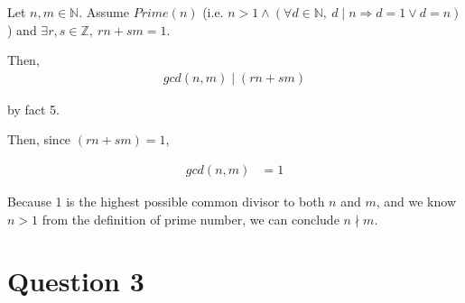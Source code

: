 \documentclass[12pt]{article}
\begin{document}
\begin{enumerate}[a.]
    Let $n,m \in \mathbb{N}$. Assume $Prime(n)$ (i.e. $n > 1 \land (\forall d \in \mathbb{N},\:
    d \mid n \Rightarrow d = 1 \lor d = n)$) and $\exists r,s \in \mathbb{Z},\:
    rn + sm = 1$.

    \bigskip

    Then,
    \setcounter{equation}{0}
    \begin{align}
        gcd(n,m) \mid (rn + sm)
    \end{align}

    by fact 5.

    \bigskip

    Then, since $(rn + sm) = 1$,

    \begin{align}
        gcd(n,m) &= 1
    \end{align}

    \bigskip

    Because 1 is the highest possible common divisor to both $n$ and $m$, and
    we know $n > 1$ from the definition of prime number, we can conclude
    $n \nmid m$.


    \bigskip


\end{enumerate}

\section*{Question 3}
\end{document}
